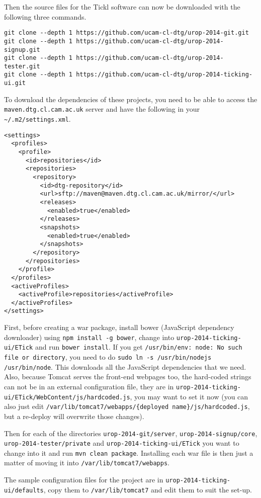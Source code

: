 \documentclass[12pt,a4paper]{article}
\newcommand{\tomcatwd}{{\tt /var/\hspace{0pt}lib/\hspace{0pt}tomcat7}}
\newcommand{\localHardcodedJs}{{\tt urop-2014-ticking-ui/\hspace{0pt}ETick/\hspace{0pt}WebContent/\hspace{0pt}js/\hspace{0pt}hardcoded.js}}
\newcommand{\deployedHardcodedJs}{\tomcatwd{\tt/\hspace{0pt}webapps/\hspace{0pt}\{deployed name\}/\hspace{0pt}js/\hspace{0pt}hardcoded.js}}
\begin{document}
Then the source files for the Tickl software can now be downloaded with the following three commands.
\begin{verbatim}
git clone --depth 1 https://github.com/ucam-cl-dtg/urop-2014-git.git
git clone --depth 1 https://github.com/ucam-cl-dtg/urop-2014-signup.git
git clone --depth 1 https://github.com/ucam-cl-dtg/urop-2014-tester.git
git clone --depth 1 https://github.com/ucam-cl-dtg/urop-2014-ticking-ui.git
\end{verbatim}

To download the dependencies of these projects, you need to be able to access the {\tt maven.dtg.cl.cam.ac.uk} server and have the following in your {\tt \~{}/.m2/settings.xml}.
\begin{verbatim}
<settings>
  <profiles>
    <profile>
      <id>repositories</id>
      <repositories>
        <repository>
          <id>dtg-repository</id>
          <url>sftp://maven@maven.dtg.cl.cam.ac.uk/mirror/</url>
          <releases>
            <enabled>true</enabled>
          </releases>
          <snapshots>
            <enabled>true</enabled>
          </snapshots>
        </repository>
      </repositories>
    </profile>
  </profiles>
  <activeProfiles>
    <activeProfile>repositories</activeProfile>
  </activeProfiles>
</settings>
\end{verbatim}

First, before creating a war package, install bower (JavaScript dependency downloader) using {\tt npm install -g bower}, change into {\tt urop-2014-ticking-ui/ETick} and run {\tt bower install}.
If you get {\tt /usr/bin/env: node: No such file or directory}, you need to do {\tt sudo ln -s /usr/bin/nodejs /usr/bin/node}.
This downloads all the JavaScript dependencies that we need.
Also, because Tomcat serves the front-end webpages too, the hard-coded strings can not be in an external configuration file, they are in \localHardcodedJs, you may want to set it now (you can also just edit \deployedHardcodedJs, but a re-deploy will overwrite those changes).

Then for each of the directories {\tt urop-2014-git/server}, {\tt urop-2014-signup/core}, {\tt urop-2014-tester/private} and {\tt urop-2014-ticking-ui/ETick} you want to change into it and run {\tt mvn clean package}.
Installing each war file is then just a matter of moving it into \tomcatwd{}{\tt/webapps}.

The sample configuration files for the project are in {\tt urop-2014-ticking-ui/defaults}, copy them to \tomcatwd{}{} and edit them to suit the set-up.
\end{document}
